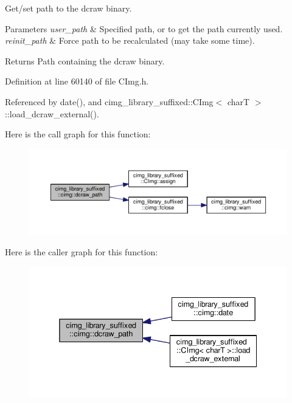 Get/set path to the {\ttfamily dcraw} binary. 


\begin{DoxyParams}{Parameters}
{\em user\+\_\+path} & Specified path, or {} to get the path currently used. \\
\hline
{\em reinit\+\_\+path} & Force path to be recalculated (may take some time). \\
\hline
\end{DoxyParams}
\begin{DoxyReturn}{Returns}
Path containing the {\ttfamily dcraw} binary. 
\end{DoxyReturn}


Definition at line 60140 of file C\+Img.\+h.



Referenced by date(), and cimg\+\_\+library\+\_\+suffixed\+::\+C\+Img$<$ char\+T $>$\+::load\+\_\+dcraw\+\_\+external().

Here is the call graph for this function\+:
\nopagebreak
\begin{figure}[H]
\begin{center}
\leavevmode
\includegraphics[width=350pt]{d4/d9b/namespacecimg__library__suffixed_1_1cimg_ad2459563e2ed326f303b9ac4e91744b0_cgraph}
\end{center}
\end{figure}
Here is the caller graph for this function\+:
\nopagebreak
\begin{figure}[H]
\begin{center}
\leavevmode
\includegraphics[width=338pt]{d4/d9b/namespacecimg__library__suffixed_1_1cimg_ad2459563e2ed326f303b9ac4e91744b0_icgraph}
\end{center}
\end{figure}
\mbox{\label{namespacecimg__library__suffixed_1_1cimg_a11aed0e6b30d75bf50946ee78d1aed94}} 
